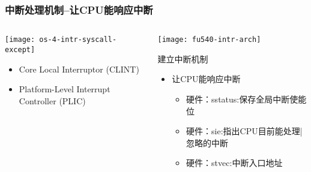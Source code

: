 \begin{frame}[plain,t]
	\frametitle{中断处理机制--让CPU能响应中断}
	\begin{columns}
		
		\begin{column}{0.45\textwidth}
			\centering
			\texttt{[image: os-4-intr-syscall-except]}
			\begin{itemize} \small
				\item Core Local	Interruptor (CLINT)
				\item Platform-Level Interrupt Controller (PLIC)
			\end{itemize}
			
		\end{column}
		
		\begin{column}{0.5\textwidth}
			
			\texttt{[image: fu540-intr-arch]}
			
			建立中断机制
			\begin{itemize}
				\item 让CPU能响应中断 \pause
					\begin{itemize} \small
						\item 硬件：sstatus:保存全局中断使能位	 \pause
						\item 硬件：sie:指出CPU目前能处理|忽略的中断 \pause
						\item 硬件：stvec:中断入口地址
					\end{itemize}		
			\end{itemize}		
			
		\end{column}
		
	\end{columns}
	
\end{frame}


